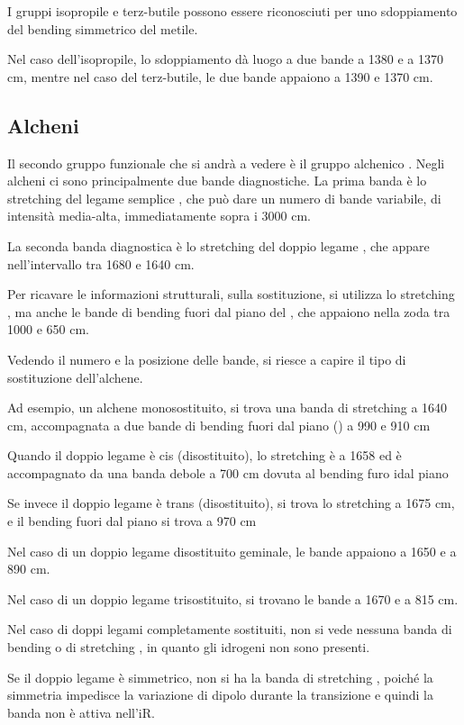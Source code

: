 I gruppi isopropile e terz-butile possono essere riconosciuti per uno
sdoppiamento del bending simmetrico del metile.

Nel caso dell'isopropile, lo sdoppiamento dà luogo a due bande a 1380 e
a 1370 cm, mentre nel caso del terz-butile, le due bande appaiono a
1390 e 1370 cm.

\subsection{Alcheni}

Il secondo gruppo funzionale che si andrà a vedere è il gruppo alchenico
. Negli alcheni ci sono principalmente due bande diagnostiche. La
prima banda è lo stretching del legame semplice , che può dare un
numero di bande variabile, di intensità media-alta, immediatamente sopra
i 3000 cm.

La seconda banda diagnostica è lo stretching del doppio legame , che
appare nell'intervallo tra 1680 e 1640 cm.

Per ricavare le informazioni strutturali, sulla sostituzione, si
utilizza lo stretching , ma anche le bande di bending fuori dal piano
del , che appaiono nella zoda tra 1000 e 650 cm.

Vedendo il numero e la posizione delle bande, si riesce a capire il tipo
di sostituzione dell'alchene.

Ad esempio, un alchene monosostituito, si trova una banda di stretching
 a 1640 cm, accompagnata a due bande di bending fuori dal piano
() a 990 e 910 cm

Quando il doppio legame è cis (disostituito), lo stretching  è a 1658
ed è accompagnato da una banda debole a 700 cm dovuta al bending furo
idal piano

Se invece il doppio legame è trans (disostituito), si trova lo
stretching  a 1675 cm, e il bending fuori dal piano si trova a 970
cm

Nel caso di un doppio legame disostituito geminale, le bande appaiono a
1650 e a 890 cm.

Nel caso di un doppio legame trisostituito, si trovano le bande a 1670 e
a 815 cm.

Nel caso di doppi legami completamente sostituiti, non si vede nessuna
banda di bending o di stretching , in quanto gli idrogeni non sono
presenti.

Se il doppio legame è simmetrico, non si ha la banda di stretching ,
poiché la simmetria impedisce la variazione di dipolo durante la
transizione e quindi la banda non è attiva nell'iR.

